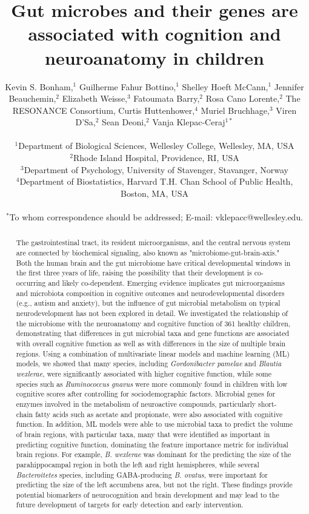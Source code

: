 \documentclass{article}
\title{Gut microbes and their genes are associated with cognition and neuroanatomy in children}
\author{%
    \parbox{\linewidth}{\centering
        Kevin S. Bonham,$^{1}$
        Guilherme Fahur Bottino,$^{1}$
        Shelley Hoeft McCann,$^{1}$
        Jennifer Beauchemin,$^{2}$
        Elizabeth Weisse,$^{3}$
        Fatoumata Barry,$^{2}$
        Rosa Cano Lorente,$^{2}$
        The RESONANCE Consortium,
        Curtis Huttenhower,$^{4}$
        Muriel Bruchhage,$^{3}$
        Viren D'Sa,$^{2}$
        Sean Deoni,$^{2}$
        Vanja Klepac-Ceraj$^{1\ast}$
    }
\\
\normalsize{$^{1}$Department of Biological Sciences, Wellesley College, Wellesley, MA, USA}\\
\normalsize{$^{2}$Rhode Island Hospital, Providence, RI, USA}\\
\normalsize{$^{3}$Department of Psychology, University of Stavenger, Stavanger, Norway}\\
\normalsize{$^{4}$Department of Biostatistics, Harvard T.H. Chan School of Public Health, Boston, MA, USA}\\
\\
\normalsize{$^\ast$To whom correspondence should be addressed; E-mail:  vklepacc@wellesley.edu.}
}
\date{}
\begin{document}
\baselineskip24pt

\maketitle 

\begin{abstract}
The gastrointestinal tract, its resident microorganisms, and the central
nervous system are connected by biochemical signaling, also known as
"microbiome-gut-brain-axis." Both the human brain and the gut microbiome
have critical developmental windows in the first three years of life,
raising the possibility that their development is co-occurring and
likely co-dependent. Emerging evidence implicates gut microorganisms and
microbiota composition in cognitive outcomes and neurodevelopmental
disorders (e.g., autism and anxiety), but the influence of gut microbial
metabolism on typical neurodevelopment has not been explored in detail.
We investigated the relationship of the microbiome with the neuroanatomy
and cognitive function of 361 healthy children, demonstrating that
differences in gut microbial taxa and gene functions are associated with
overall cognitive function as well as with differences in the size of
multiple brain regions.
Using a combination of multivariate linear
models and machine learning (ML) models, we showed that many species,
including \emph{Gordonibacter pamelae} and \emph{Blautia wexlerae}, were
significantly associated with higher cognitive function, while some
species such as \emph{Ruminococcus gnavus} were more commonly found in
children with low cognitive scores after controlling for sociodemographic factors.
Microbial genes for enzymes involved in the metabolism of
neuroactive compounds, particularly short-chain fatty acids such as
acetate and propionate, were also associated with cognitive function.
In addition, ML models were able to use microbial taxa to predict the
volume of brain regions, with particular taxa, many that were identified
as important in predicting cognitive function, dominating the
feature importance metric for individual brain regions. For example, \emph{B.
wexlerae} was dominant for the predicting the size of the parahippocampal region
in both the left and right hemispheres, while several \textit{Bacteroitetes} species,
including GABA-producing \emph{B. ovatus}, were important for predicting
the size of the left accumbens area, but not the right. These
findings provide potential biomarkers of neurocognition and brain development
and may lead to the future development of targets for early detection and early
intervention.
\end{abstract}
\end{document}
